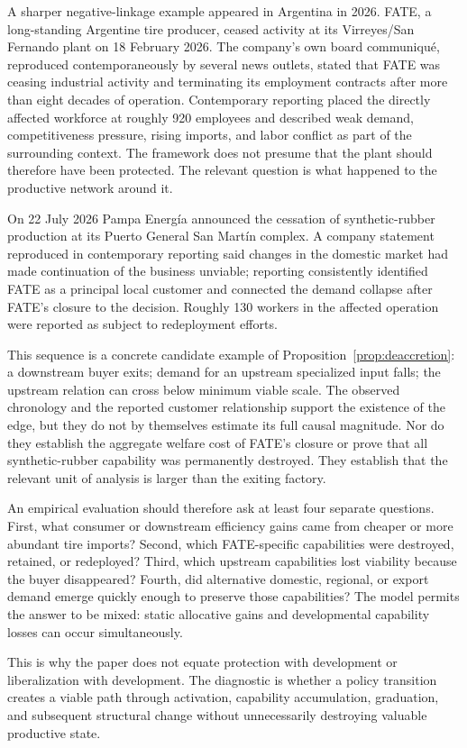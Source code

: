 A sharper negative-linkage example appeared in Argentina in 2026. FATE, a long-standing Argentine tire producer, ceased activity at its Virreyes/San Fernando plant on 18 February 2026. The company's own board communiqu\'e, reproduced contemporaneously by several news outlets, stated that FATE was ceasing industrial activity and terminating its employment contracts after more than eight decades of operation. Contemporary reporting placed the directly affected workforce at roughly 920 employees and described weak demand, competitiveness pressure, rising imports, and labor conflict as part of the surrounding context. The framework does not presume that the plant should therefore have been protected. The relevant question is what happened to the productive network around it.

On 22 July 2026 Pampa Energ\'ia announced the cessation of synthetic-rubber production at its Puerto General San Mart\'in complex. A company statement reproduced in contemporary reporting said changes in the domestic market had made continuation of the business unviable; reporting consistently identified FATE as a principal local customer and connected the demand collapse after FATE's closure to the decision. Roughly 130 workers in the affected operation were reported as subject to redeployment efforts.

This sequence is a concrete candidate example of Proposition~\ref{prop:deaccretion}: a downstream buyer exits; demand for an upstream specialized input falls; the upstream relation can cross below minimum viable scale. The observed chronology and the reported customer relationship support the existence of the edge, but they do not by themselves estimate its full causal magnitude. Nor do they establish the aggregate welfare cost of FATE's closure or prove that all synthetic-rubber capability was permanently destroyed. They establish that the relevant unit of analysis is larger than the exiting factory.

An empirical evaluation should therefore ask at least four separate questions. First, what consumer or downstream efficiency gains came from cheaper or more abundant tire imports? Second, which FATE-specific capabilities were destroyed, retained, or redeployed? Third, which upstream capabilities lost viability because the buyer disappeared? Fourth, did alternative domestic, regional, or export demand emerge quickly enough to preserve those capabilities? The model permits the answer to be mixed: static allocative gains and developmental capability losses can occur simultaneously.

This is why the paper does not equate protection with development or liberalization with development. The diagnostic is whether a policy transition creates a viable path through activation, capability accumulation, graduation, and subsequent structural change without unnecessarily destroying valuable productive state.
